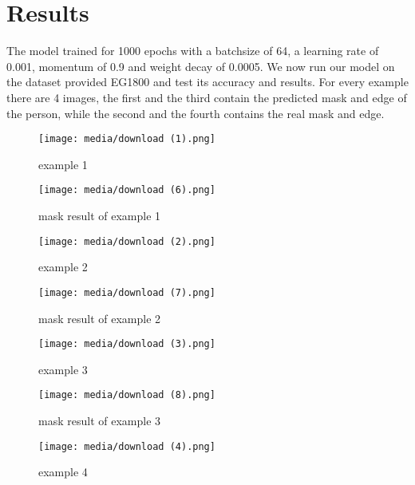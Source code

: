 \section{Results}
The model trained for 1000 epochs with a batchsize of 64, a learning rate of 0.001, momentum of 0.9 and weight decay of 0.0005.
We now run our model on the dataset provided EG1800 and test its accuracy and results. 
For every example there are 4 images, the first and the third contain the predicted mask and edge of the person, while the second and the fourth contains the real mask and edge.


\begin{figure}[H]
    \centering
    \texttt{[image: media/download (1).png]}
    \caption{example 1}
    \label{fig:enter-label}
\end{figure}

\begin{figure}[H]
    \centering
    \texttt{[image: media/download (6).png]}
    \caption{mask result of example 1}
    \label{fig:enter-label}
\end{figure}

\begin{figure}[H]
    \centering
    \texttt{[image: media/download (2).png]}
    \caption{example 2}
    \label{fig:enter-label}
\end{figure}

\begin{figure}[H]
    \centering
    \texttt{[image: media/download (7).png]}
    \caption{mask result of example 2}
    \label{fig:enter-label}
\end{figure}

\begin{figure}[H]
    \centering
    \texttt{[image: media/download (3).png]}
    \caption{example 3}
    \label{fig:enter-label}
\end{figure}

\begin{figure}[H]
    \centering
    \texttt{[image: media/download (8).png]}
    \caption{mask result of example 3}
    \label{fig:enter-label}
\end{figure}

\begin{figure}[H]
    \centering
    \texttt{[image: media/download (4).png]}
    \caption{example 4}
    \label{fig:enter-label}
\end{figure}

